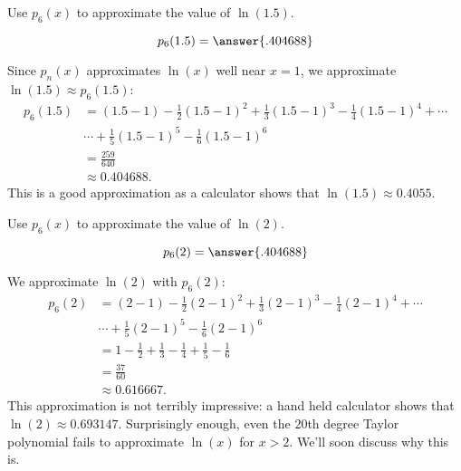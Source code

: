\documentclass{ximera}
\begin{document}
\begin{question}
  Use $p_6(x)$ to approximate the value of $\ln(1.5)$.
  \begin{prompt}
    \[
    p_6(1.5) = \answer{.404688}
    \]
  \end{prompt}
  \begin{hint}
    Since $p_n(x)$ approximates $\ln(x)$ well near $x=1$, we approximate
    $\ln(1.5) \approx p_6(1.5)$:
    \begin{align*}
      p_6(1.5) &= (1.5-1)-\frac12(1.5-1)^2+\frac13(1.5-1)^3-\frac14(1.5-1)^4+\cdots \\
      &\cdots +\frac15(1.5-1)^5-\frac16(1.5-1)^6\\
      &=\frac{259}{640}\\
      &\approx 0.404688.
    \end{align*}
    This is a good approximation as a calculator shows that $\ln(1.5)
    \approx 0.4055.$
  \end{hint}
  \begin{question}
    Use $p_6(x)$ to approximate the value of $\ln(2)$.
    \begin{prompt} 
      \[
      p_6(2) = \answer{.404688}
      \]
    \end{prompt}
    \begin{hint}
      We approximate $\ln(2)$ with $ p_6(2)$:
      \begin{align*}
        p_6(2) &= (2-1)-\frac12(2-1)^2+\frac13(2-1)^3-\frac14(2-1)^4+\cdots \\
        &\cdots +\frac15(2-1)^5-\frac16(2-1)^6\\
        &=	1-\frac12+\frac13-\frac14+\frac15-\frac16 \\
        &= \frac{37}{60}\\ 
        &\approx 0.616667.
      \end{align*}
      This approximation is not terribly impressive: a hand held
      calculator shows that $\ln(2) \approx 0.693147$. Surprisingly
      enough, even the $20$th degree Taylor polynomial fails to
      approximate $\ln(x)$ for $x>2$. We'll soon discuss why this is.
    \end{hint}
  \end{question}
\end{question}
\end{document}

